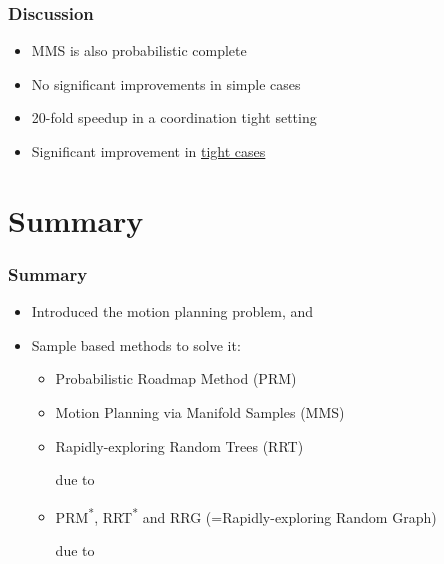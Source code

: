 \documentclass{beamer}
\begin{document}
\begin{frame}
  \frametitle{Discussion}
  \begin{itemize}
  \item<1-> MMS is also probabilistic complete
  \item<2-> No significant improvements in simple cases
  \item<2-> 20-fold speedup in a coordination tight setting
  \item<2-> Significant improvement in \href{http://acg.cs.tau.ac.il/projects/mms/project-page}{tight cases}
  \end{itemize}

\end{frame}

\section*{Summary}
\begin{frame}
  \frametitle{Summary}
  \begin{itemize}
  \item Introduced the motion planning problem, and
  \item Sample based methods to solve it:
    \begin{itemize}
    \item Probabilistic Roadmap Method (PRM)
    \item Motion Planning via Manifold Samples (MMS)
    \item Rapidly-exploring Random Trees (RRT)\\ {\raggedleft due to \cite{La00}\par}
    \item PRM\textsuperscript{*}, RRT\textsuperscript{*} and RRG (=Rapidly-exploring Random Graph)\\ {\raggedleft due to \cite{Ka11}\par}
    \end{itemize}
  \end{itemize}
\end{frame}
\end{document}
